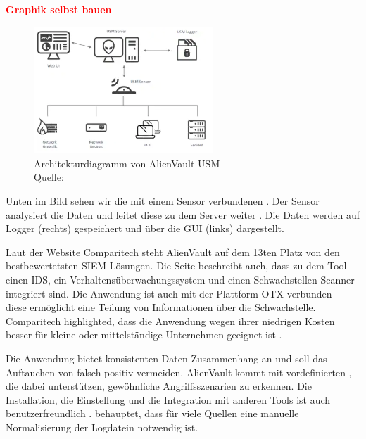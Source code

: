 \textbf{\textcolor{red}{Graphik selbst bauen}}

\begin{figure}[H]
   \centering
   \includegraphics[width=0.6\textwidth]{assets/2_p6.png}
   \caption[Architekturdiagramm von AlienVault \gls{USM}]
   {Architekturdiagramm von AlienVault \gls{USM} \\Quelle: \citep{ATT_AVO} }
   \label{fig:AlienVault_Architektur}
   \centering
\end{figure}

Unten im Bild sehen wir die mit einem Sensor verbundenen . Der Sensor analysiert die Daten und leitet diese zu dem Server weiter \citep{AV_Sensor}. Die Daten werden auf Logger (rechts) gespeichert und über die \gls{GUI} (links) dargestellt. 

Laut der Website Comparitech steht AlienVault auf dem 13ten Platz von den bestbewertetsten \gls{SIEM}-Lösungen. Die Seite beschreibt auch, dass zu dem Tool einen \gls{IDS}, ein Verhaltensüberwachungssystem und einen Schwachstellen-Scanner integriert sind. Die Anwendung ist auch mit der Plattform \gls{OTX} verbunden - diese ermöglicht eine Teilung von Informationen über die Schwachstelle. Comparitech highlighted, dass die Anwendung wegen ihrer niedrigen Kosten besser für kleine oder mittelständige Unternehmen geeignet ist \citep{comparitech_SIEM}. 

Die Anwendung bietet konsistenten Daten Zusammenhang an und soll das Auftauchen von \gls{falsch positiv} vermeiden. AlienVault kommt mit vordefinierten , die dabei unterstützen, gewöhnliche Angriffsszenarien zu erkennen. Die Installation, die Einstellung und die Integration mit anderen Tools ist auch benutzerfreundlich \citep{Gomes_AV}. \citep{Nabil_AV} behauptet, dass für viele Quellen eine manuelle Normalisierung der Logdatein notwendig ist.


